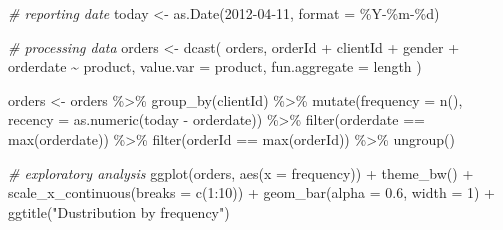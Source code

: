 \documentclass[
]{book}
\newenvironment{Shaded}{\begin{snugshade}}{\end{snugshade}}
\newcommand{\AttributeTok}[1]{\textcolor[rgb]{0.77,0.63,0.00}{#1}}
\newcommand{\CommentTok}[1]{\textcolor[rgb]{0.56,0.35,0.01}{\textit{#1}}}
\newcommand{\DecValTok}[1]{\textcolor[rgb]{0.00,0.00,0.81}{#1}}
\newcommand{\FloatTok}[1]{\textcolor[rgb]{0.00,0.00,0.81}{#1}}
\newcommand{\FunctionTok}[1]{\textcolor[rgb]{0.00,0.00,0.00}{#1}}
\newcommand{\NormalTok}[1]{#1}
\newcommand{\OtherTok}[1]{\textcolor[rgb]{0.56,0.35,0.01}{#1}}
\newcommand{\SpecialCharTok}[1]{\textcolor[rgb]{0.00,0.00,0.00}{#1}}
\newcommand{\StringTok}[1]{\textcolor[rgb]{0.31,0.60,0.02}{#1}}
\begin{document}
\begin{Shaded}
\begin{Highlighting}[]
\CommentTok{\# reporting date}
\NormalTok{today }\OtherTok{\textless{}{-}} \FunctionTok{as.Date}\NormalTok{(}\StringTok{\textquotesingle{}2012{-}04{-}11\textquotesingle{}}\NormalTok{, }\AttributeTok{format =} \StringTok{\textquotesingle{}\%Y{-}\%m{-}\%d\textquotesingle{}}\NormalTok{)}

\CommentTok{\# processing data}
\NormalTok{orders }\OtherTok{\textless{}{-}}
    \FunctionTok{dcast}\NormalTok{(}
\NormalTok{        orders,}
\NormalTok{        orderId }\SpecialCharTok{+}\NormalTok{ clientId }\SpecialCharTok{+}\NormalTok{ gender }\SpecialCharTok{+}\NormalTok{ orderdate }\SpecialCharTok{\textasciitilde{}}\NormalTok{ product,}
        \AttributeTok{value.var =} \StringTok{\textquotesingle{}product\textquotesingle{}}\NormalTok{,}
        \AttributeTok{fun.aggregate =}\NormalTok{ length}
\NormalTok{    )}

\NormalTok{orders }\OtherTok{\textless{}{-}}\NormalTok{ orders }\SpecialCharTok{\%\textgreater{}\%}
    \FunctionTok{group\_by}\NormalTok{(clientId) }\SpecialCharTok{\%\textgreater{}\%}
    \FunctionTok{mutate}\NormalTok{(}\AttributeTok{frequency =} \FunctionTok{n}\NormalTok{(),}
           \AttributeTok{recency =} \FunctionTok{as.numeric}\NormalTok{(today }\SpecialCharTok{{-}}\NormalTok{ orderdate)) }\SpecialCharTok{\%\textgreater{}\%}
    \FunctionTok{filter}\NormalTok{(orderdate }\SpecialCharTok{==} \FunctionTok{max}\NormalTok{(orderdate)) }\SpecialCharTok{\%\textgreater{}\%}
    \FunctionTok{filter}\NormalTok{(orderId }\SpecialCharTok{==} \FunctionTok{max}\NormalTok{(orderId)) }\SpecialCharTok{\%\textgreater{}\%}
    \FunctionTok{ungroup}\NormalTok{()}

\CommentTok{\# exploratory analysis}
\FunctionTok{ggplot}\NormalTok{(orders, }\FunctionTok{aes}\NormalTok{(}\AttributeTok{x =}\NormalTok{ frequency)) }\SpecialCharTok{+}
    \FunctionTok{theme\_bw}\NormalTok{() }\SpecialCharTok{+}
    \FunctionTok{scale\_x\_continuous}\NormalTok{(}\AttributeTok{breaks =} \FunctionTok{c}\NormalTok{(}\DecValTok{1}\SpecialCharTok{:}\DecValTok{10}\NormalTok{)) }\SpecialCharTok{+}
    \FunctionTok{geom\_bar}\NormalTok{(}\AttributeTok{alpha =} \FloatTok{0.6}\NormalTok{, }\AttributeTok{width =} \DecValTok{1}\NormalTok{) }\SpecialCharTok{+}
    \FunctionTok{ggtitle}\NormalTok{(}\StringTok{"Dustribution by frequency"}\NormalTok{)}
\end{Highlighting}
\end{Shaded}
\end{document}
